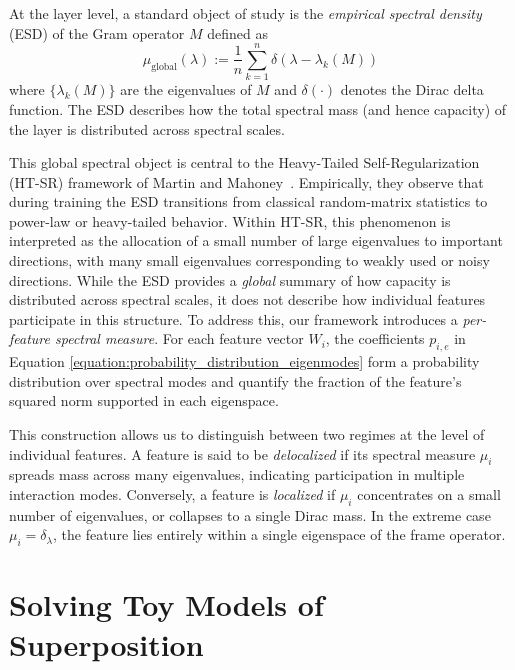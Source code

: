 \documentclass{article}
\theoremstyle{plain}
\numberwithin{equation}{section}
\theoremstyle{definition}
\theoremstyle{remark}
\begin{document}
At the layer level, a standard object of study is the \emph{empirical spectral density} (ESD) of the Gram operator $M$
defined as $$\mu_{\mathrm{global}}(\lambda)
:= \frac{1}{n} \sum_{k=1}^{n} \delta\!\left(\lambda - \lambda_k(M)\right)$$
where $\{\lambda_k(M)\}$ are the eigenvalues of $M$ and $\delta(\cdot)$ denotes the Dirac delta function. The ESD describes how the total spectral mass (and hence capacity) of the layer is distributed across spectral scales.

This global spectral object is central to the Heavy-Tailed Self-Regularization (HT-SR) framework of Martin and Mahoney~\citep{htsr1}. Empirically, they observe that during training the ESD transitions from classical random-matrix statistics to power-law or heavy-tailed behavior. Within HT-SR, this phenomenon is interpreted as the allocation of a small number of large eigenvalues to important directions, with many small eigenvalues corresponding to weakly used or noisy directions.
\fi
While the ESD provides a \emph{global} summary of how capacity is distributed across spectral scales, it does not describe how individual features participate in this structure. To address this, our framework introduces a \emph{per-feature spectral measure}. For each feature vector $W_i$, the coefficients $p_{i,e}$ in Equation \ref{equation:probability_distribution_eigenmodes} form a probability distribution over spectral modes and quantify the fraction of the feature’s squared norm supported in each eigenspace.

This construction allows us to distinguish between two regimes at the level of individual features. A feature is said to be \emph{delocalized} if its spectral measure $\mu_i$ spreads mass across many eigenvalues, indicating participation in multiple interaction modes. Conversely, a feature is \emph{localized} if $\mu_i$ concentrates on a small number of eigenvalues, or collapses to a single Dirac mass. In the extreme case $\mu_i = \delta_{\lambda}$, the feature lies entirely within a single eigenspace of the frame operator.





\section{Solving Toy Models of Superposition}
\label{section:tms}
\end{document}
